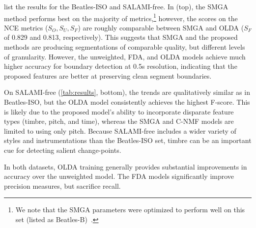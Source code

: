 \documentclass{article}
\begin{document}


 list the results for the Beatles-ISO and SALAMI-free.
In  (top), the SMGA method performs best on the majority of metrics,\footnote{We
note that the SMGA parameters were optimized to perform well on this set (listed as
Beatles-B)~\cite{serra2012unsupervised}.}
however, the scores on the NCE metrics ($S_O, S_U, S_F$) are roughly comparable between SMGA and OLDA ($S_F$ of 0.829
and 0.813, respectively). 
This suggests that SMGA and the proposed methods are producing segmentations of comparable quality, but 
different levels of granularity.
However, the unweighted, FDA, and OLDA models achieve much higher accuracy for boundary detection at 0.5s resolution,
indicating that the proposed features are better at preserving clean segment boundaries.  

On SALAMI-free (\cref{tab:results}, bottom), the trends are qualitatively similar as in Beatles-ISO, but the OLDA
model consistently achieves the highest F-score. 
This is likely due to the proposed model's ability to incorporate disparate feature types (timbre, pitch, and time), whereas the SMGA and C-NMF models are limited to using only pitch. 
Because SALAMI-free includes a wider variety of styles and instrumentations than the Beatles-ISO set, 
timbre can be an important cue for detecting salient change-points.

In both datasets, OLDA training generally provides substantial improvements in accuracy over the unweighted model. 
The FDA models significantly improve precision measures, but sacrifice recall.
\end{document}

